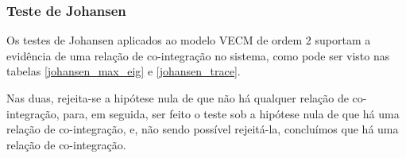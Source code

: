 \documentclass[a4paper,
               article,
               12pt,
               openany,
               oneside,
               english,
               brazil]{abntex2}
\numberwithin{equation}{section}
\begin{document}
    \subsubsection{Teste de Johansen}

    Os testes de Johansen aplicados ao modelo VECM de ordem 2 suportam a evidência de uma relação de co-integração no sistema, como pode ser visto nas tabelas \autoref{johansen_max_eig} e \autoref{johansen_trace}.

 \begin{table}[hbt]
     \begin{subtable}{.5\linewidth}
     \end{subtable}%
     \begin{subtable}{.5\linewidth}
     \end{subtable}%
 \end{table}

    Nas duas, rejeita-se a hipótese nula de que não há qualquer relação de co-integração, para, em seguida, ser feito o teste sob a hipótese nula de que há uma relação de co-integração, e, não sendo possível rejeitá-la, concluímos que há uma relação de co-integração.
\end{document}
